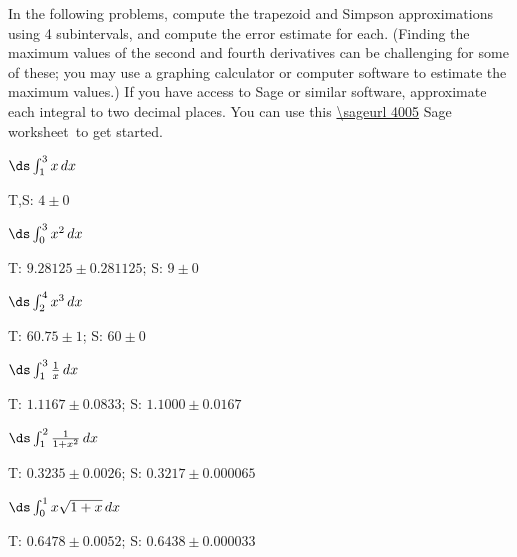 \begin{exercises}

In the following problems, compute the trapezoid and Simpson
approximations using 4 subintervals, and compute the error estimate
for each. (Finding the maximum values of the second and fourth
derivatives can be challenging for some of these; you may use a
graphing calculator or computer software to estimate the maximum
values.)  If you have access to Sage or similar software, approximate
each integral to two decimal places.  You can use this
\expandafter\url\expandafter{\sageurl 4005}%
Sage worksheet\endurl\ to
get started.

\twocol

\begin{exercise} $\ds\int_1^3 x\,dx$
\begin{answer} T,S: $4\pm0$
\end{answer}\end{exercise}

\begin{exercise} $\ds\int_0^3 x^2\,dx$
\begin{answer} T: $9.28125\pm0.281125 $; S: $9\pm0$
\end{answer}\end{exercise}

\begin{exercise} $\ds\int_2^4 x^3\,dx$
\begin{answer} T: $60.75\pm1$; S: $60\pm0$
\end{answer}\end{exercise}

\begin{exercise} $\ds\int_1^3 {1\over x}\,dx$
\begin{answer} T: $1.1167\pm 0.0833$; S: $1.1000\pm 0.0167$
\end{answer}\end{exercise}

\begin{exercise} $\ds\int_1^2 {1\over 1+x^2}\,dx$
\begin{answer} T: $0.3235\pm 0.0026$; S: $0.3217\pm 0.000065$
\end{answer}\end{exercise}

\begin{exercise} $\ds\int_0^1 x\sqrt{1+x}\,dx$
\begin{answer} T: $0.6478\pm 0.0052$; S: $0.6438\pm 0.000033$
\end{answer}\end{exercise}


\end{exercises}
